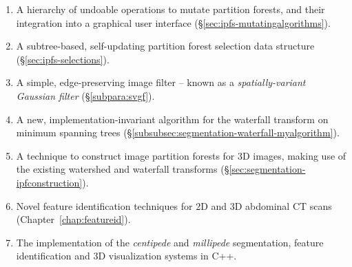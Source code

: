 \begin{enumerate}
\item A hierarchy of undoable operations to mutate partition forests, and their integration into a graphical user interface (\S\ref{sec:ipfs-mutatingalgorithms}).
\item A subtree-based, self-updating partition forest selection data structure (\S\ref{sec:ipfs-selections}).
\item A simple, edge-preserving image filter -- known as a \emph{spatially-variant Gaussian filter} (\S\ref{subpara:svgf}).
\item A new, implementation-invariant algorithm for the waterfall transform on minimum spanning trees (\S\ref{subsubsec:segmentation-waterfall-myalgorithm}).
\item A technique to construct image partition forests for 3D images, making use of the existing watershed and waterfall transforms (\S\ref{sec:segmentation-ipfconstruction}).
\item Novel feature identification techniques for 2D and 3D abdominal CT scans (Chapter~\ref{chap:featureid}).
\item The implementation of the \emph{centipede} and \emph{millipede} segmentation, feature identification and 3D visualization systems in C++.
\end{enumerate}

